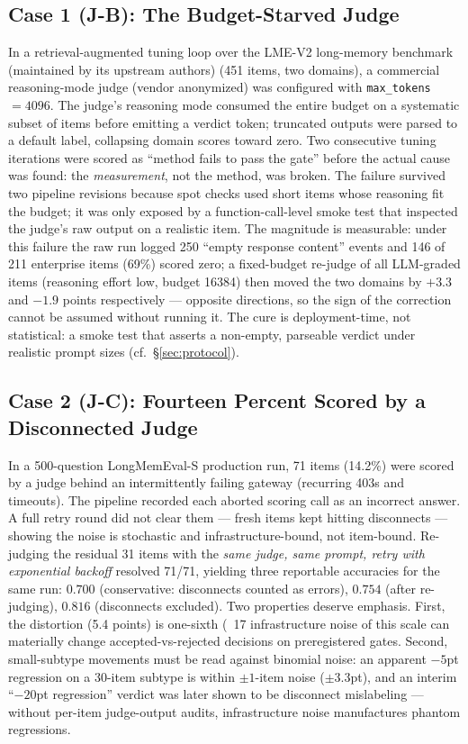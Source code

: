 \documentclass[11pt]{article}
\begin{document}
\subsection{Case 1 (J-B): The Budget-Starved Judge}
\label{sec:case-budget}

In a retrieval-augmented tuning loop over the LME-V2 long-memory benchmark~\cite{lmev2}
(maintained by its upstream authors)
(451 items, two domains), a commercial reasoning-mode judge (vendor anonymized) was configured with
\texttt{max\_tokens}$=4096$. The judge's reasoning mode consumed the entire
budget on a systematic subset of items before emitting a verdict token;
truncated outputs were parsed to a default label, collapsing domain scores
toward zero. Two consecutive tuning iterations were scored as ``method fails
to pass the gate'' before the actual cause was found: the \emph{measurement},
not the method, was broken. The failure survived two pipeline revisions
because spot checks used short items whose reasoning fit the budget; it was
only exposed by a function-call-level smoke test that inspected the judge's
raw output on a realistic item. The magnitude is measurable: under this failure
the raw run logged 250 ``empty response content'' events and 146 of 211
enterprise items (69\%) scored zero; a fixed-budget re-judge of all LLM-graded
items (reasoning effort low, budget 16384) then moved the two domains by
$+3.3$ and $-1.9$ points respectively --- opposite directions, so the sign of
the correction cannot be assumed without running it. The cure is
deployment-time, not statistical:
a smoke test that asserts a non-empty, parseable verdict under realistic
prompt sizes (cf.\ \S\ref{sec:protocol}).

\subsection{Case 2 (J-C): Fourteen Percent Scored by a Disconnected Judge}
\label{sec:case-connect}

In a 500-question LongMemEval-S production run, 71 items (14.2\%) were scored
by a judge behind an intermittently failing gateway (recurring 403s and
timeouts). The pipeline recorded each aborted scoring call as an incorrect
answer. A full retry round did not clear them --- fresh items kept hitting
disconnects --- showing the noise is stochastic and infrastructure-bound, not
item-bound. Re-judging the residual 31 items with the \emph{same judge, same
prompt, retry with exponential backoff} resolved 71/71, yielding three
reportable accuracies for the same run: $0.700$ (conservative: disconnects
counted as errors), $0.754$ (after re-judging), $0.816$ (disconnects
excluded). Two properties deserve emphasis. First, the distortion (5.4 points)
is one-sixth (~17%
infrastructure noise of this scale can materially change accepted-vs-rejected
decisions on preregistered gates. Second, small-subtype movements must be read
against binomial noise: an apparent $-5$pt regression on a 30-item subtype is
within $\pm 1$-item noise ($\pm 3.3$pt), and an interim ``$-20$pt regression''
verdict was later shown to be disconnect mislabeling --- without per-item
judge-output audits, infrastructure noise manufactures phantom regressions.
\end{document}
